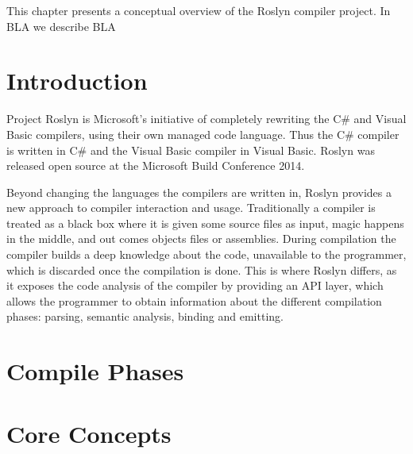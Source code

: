 \makeatletter {}\makeatother
{}
This chapter presents a conceptual overview of the Roslyn compiler project. In BLA we describe BLA

\section{Introduction}
Project Roslyn is Microsoft's initiative of completely rewriting the C\# and Visual Basic compilers, using their own managed code language. Thus the C\# compiler is written in C\# and the Visual Basic compiler in Visual Basic. Roslyn was released open source at the Microsoft Build Conference 2014\cite{csharpBuild}.

Beyond changing the languages the compilers are written in, Roslyn provides a new approach to compiler interaction and usage. Traditionally a compiler is treated as a black box where it is given some source files as input, magic happens in the middle, and out comes objects files or assemblies\cite[p. 3]{ng2012roslyn}. During compilation the compiler builds a deep knowledge about the code, unavailable to the programmer, which is discarded once the compilation is done. This is where Roslyn differs, as it exposes the code analysis of the compiler by providing an API layer, which allows the programmer to obtain information about the different compilation phases: parsing, semantic analysis, binding and emitting\cite[p. 3]{ng2012roslyn}.








\section{Compile Phases}

\section{Core Concepts}
\worksheetend